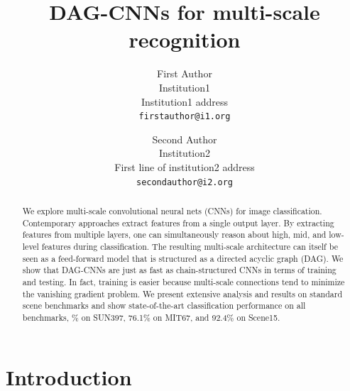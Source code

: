 \documentclass[10pt,twocolumn,letterpaper]{article}
\begin{document}
\title{DAG-CNNs for multi-scale recognition}

\author{First Author\\
Institution1\\
Institution1 address\\
{\tt\small firstauthor@i1.org}
\and
Second Author\\
Institution2\\
First line of institution2 address\\
{\tt\small secondauthor@i2.org}
}

\maketitle

\begin{abstract}
We explore multi-scale convolutional neural nets (CNNs) for image classification. Contemporary approaches extract features from a single output layer. By extracting features from multiple layers, one can simultaneously reason about high, mid, and low-level features during classification. The resulting multi-scale architecture can itself be seen as a feed-forward model that is structured as a directed acyclic graph (DAG). We show that DAG-CNNs are just as fast as chain-structured CNNs in terms of training and testing. In fact, training is easier because multi-scale connections tend to minimize the vanishing gradient problem. We present extensive analysis and results on standard scene benchmarks and show state-of-the-art classification performance on all benchmarks, \% on SUN397, 76.1\% on MIT67, and 92.4\% on Scene15.

\end{abstract}

\section{Introduction}
\end{document}
